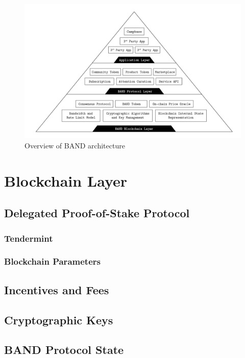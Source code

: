 \documentclass[letterpaper,11pt]{article}
\begin{document}
\begin{figure}[h]
    \centering
    \includegraphics[width=1.05\textwidth]{figures/pyramid}
    \caption{Overview of BAND architecture}
    \label{fig:pyramid}
\end{figure}

\clearpage
\newpage

\section{Blockchain Layer}

\subsection{Delegated Proof-of-Stake Protocol}

\subsubsection{Tendermint}

\subsubsection{Blockchain Parameters}

\subsection{Incentives and Fees}

\subsection{Cryptographic Keys}

\subsection{BAND Protocol State}
\end{document}

